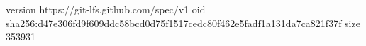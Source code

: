 version https://git-lfs.github.com/spec/v1
oid sha256:d47e306fd9f609ddc58bcd0d75f1517cedc80f462e5fadf1a131da7ca821f37f
size 353931
